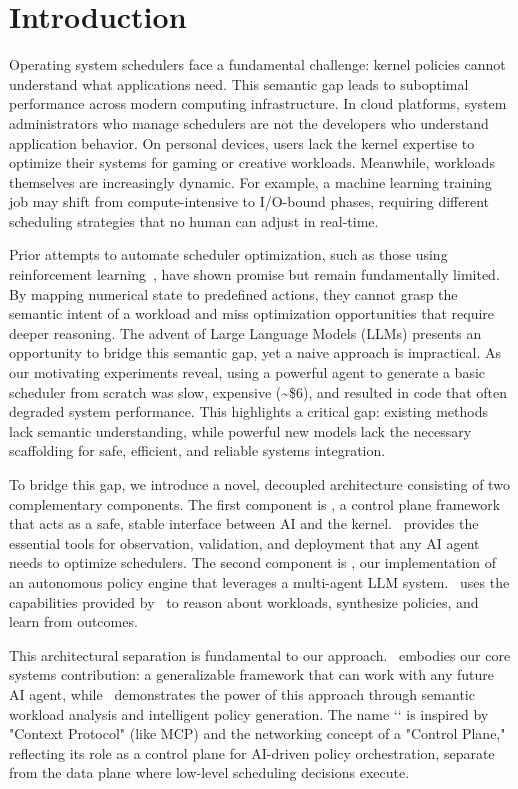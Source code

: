 \section{Introduction}
\label{sec:intro}

Operating system schedulers face a fundamental challenge: kernel policies cannot understand what applications need. This semantic gap leads to suboptimal performance across modern computing infrastructure. In cloud platforms, system administrators who manage schedulers are not the developers who understand application behavior. On personal devices, users lack the kernel expertise to optimize their systems for gaming or creative workloads. Meanwhile, workloads themselves are increasingly dynamic. For example, a machine learning training job may shift from compute-intensive to I/O-bound phases, requiring different scheduling strategies that no human can adjust in real-time.

Prior attempts to automate scheduler optimization, such as those using reinforcement learning~\cite{mao2019decima, qiu2020firm}, have shown promise but remain fundamentally limited. By mapping numerical state to predefined actions, they cannot grasp the semantic intent of a workload and miss optimization opportunities that require deeper reasoning. The advent of Large Language Models (LLMs) presents an opportunity to bridge this semantic gap, yet a naive approach is impractical. As our motivating experiments reveal, using a powerful agent to generate a basic scheduler from scratch was slow, expensive (\textasciitilde\$6), and resulted in code that often degraded system performance. This highlights a critical gap: existing methods lack semantic understanding, while powerful new models lack the necessary scaffolding for safe, efficient, and reliable systems integration.

To bridge this gap, we introduce a novel, decoupled architecture consisting of two complementary components. The first component is \sys, a control plane framework that acts as a safe, stable interface between AI and the kernel. \sys\ provides the essential tools for observation, validation, and deployment that any AI agent needs to optimize schedulers. The second component is \agent, our implementation of an autonomous policy engine that leverages a multi-agent LLM system. \agent\ uses the capabilities provided by \sys\ to reason about workloads, synthesize policies, and learn from outcomes.

This architectural separation is fundamental to our approach. \sys\ embodies our core systems contribution: a generalizable framework that can work with any future AI agent, while \agent\ demonstrates the power of this approach through semantic workload analysis and intelligent policy generation. The name `\sys` is inspired by "Context Protocol" (like MCP) and the networking concept of a "Control Plane," reflecting its role as a control plane for AI-driven policy orchestration, separate from the data plane where low-level scheduling decisions execute.

